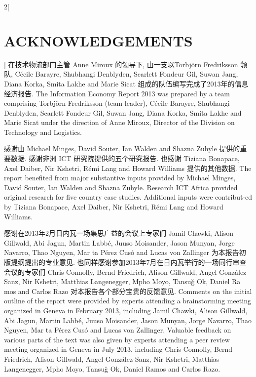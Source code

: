 \documentclass[a4paper, UTF8, 12pt]{article}
\begin{document}
\begin{paracol}{2}[\section{ACKNOWLEDGEMENTS}]
    \switchcolumn*
    在技术物流部门主管 Anne Miroux 的领导下, 由一支以Torbjörn Fredriksson 领队, Cécile Barayre, Shubhangi Denblyden, Scarlett Fondeur Gil, Suwan Jang, Diana Korka, Smita Lakhe and Marie Sicat 组成的队伍编写完成了2013年的信息经济报告.
    \switchcolumn
    The Information Economy Report 2013 was prepared by a team comprising Torbjörn Fredriksson (team leader), Cécile Barayre, Shubhangi Denblyden, Scarlett Fondeur Gil, Suwan Jang, Diana Korka, Smita Lakhe and Marie Sicat under the direction of Anne Miroux, Director of the Division on Technology and Logistics. 
   
    \switchcolumn*
    感谢由 Michael Minges, David Souter, Ian Walden and Shazna Zuhyle 提供的重要数据. 感谢非洲 ICT 研究院提供的五个研究报告. 也感谢 Tiziana Bonapace, Axel Daiber, Nir Kshetri, Rémi Lang and Howard Williams 提供的其他数据.
    \switchcolumn
    The report benefited from major substantive inputs provided by Michael Minges, David Souter, Ian Walden and Shazna Zuhyle. Research ICT Africa provided original research for five country case studies. Additional inputs were contribut-ed by Tiziana Bonapace, Axel Daiber, Nir Kshetri, Rémi Lang and Howard Williams. 
   
    \switchcolumn*
    感谢在2013年2月日内瓦一场集思广益的会议上专家们 Jamil Chawki, Alison Gillwald, Abi Jagun, Martin Labbé, Juuso Moisander, Jason Munyan, Jorge Navarro, Thao Nguyen, Mar ta Pérez Cusó and Lucas von Zallinger 为本报告初版提纲提出的专业意见. 也同样感谢参加2013年7月在日内瓦举行的一场同行审查会议的专家们 Chris Connolly, Bernd Friedrich, Alison Gillwald, Angel González-Sanz, Nir Kshetri, Matthias Langenegger, Mpho Moyo, Tansuğ Ok, Daniel Ra mos and Carlos Razo 对本报告各个部分宝贵的反馈意见.
    \switchcolumn
    Comments on the initial outline of the report were provided by experts attending a brainstorming meeting organized in Geneva in February 2013, including Jamil Chawki, Alison Gillwald, Abi Jagun, Martin Labbé, Juuso Moisander, Jason Munyan, Jorge Navarro, Thao Nguyen, Mar ta Pérez Cusó and Lucas von Zallinger. Valuable feedback on various parts of the text was also given by experts attending a peer review meeting organized in Geneva in July 2013, including Chris Connolly, Bernd Friedrich, Alison Gillwald, Angel González-Sanz, Nir Kshetri, Matthias Langenegger, Mpho Moyo, Tansuğ Ok, Daniel Ramos and Carlos Razo. 
   

\end{paracol}
\end{document}
